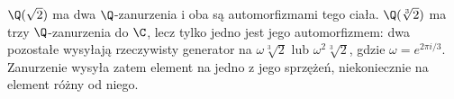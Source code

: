 \begin{przyklad}
$\Q(\sqrt2)$ ma dwa $\Q$-zanurzenia i oba są automorfizmami tego ciała. $\Q(\sqrt[3]{2})$ ma trzy $\Q$-zanurzenia do $\C$, lecz tylko jedno jest jego automorfizmem: dwa pozostałe wysyłają rzeczywisty generator na $\omega\sqrt[3]{2}$ lub $\omega^2\sqrt[3]{2}$, gdzie $\omega=e^{2\pi i/3}$. Zanurzenie wysyła zatem element na jedno z jego sprzężeń, niekoniecznie na element różny od niego.
\end{przyklad}


